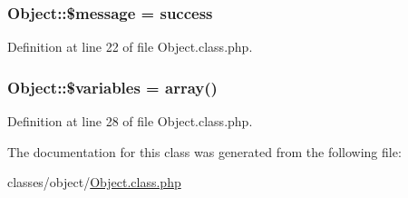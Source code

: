 \hypertarget{classObject_af661550c62873d6b6e61f32d68c56973}{}
\subsubsection[{\$message}]{\setlength{\rightskip}{0pt plus 5cm}Object\+::\$message = \textquotesingle{}success\textquotesingle{}}\label{classObject_af661550c62873d6b6e61f32d68c56973}


Definition at line 22 of file Object.\+class.\+php.

\hypertarget{classObject_a153e76f6619408780cc2b50cef5100c6}{}
\subsubsection[{\$variables}]{\setlength{\rightskip}{0pt plus 5cm}Object\+::\$variables = array()}\label{classObject_a153e76f6619408780cc2b50cef5100c6}


Definition at line 28 of file Object.\+class.\+php.



The documentation for this class was generated from the following file\+:\begin{DoxyCompactItemize}
\item 
classes/object/\hyperlink{Object_8class_8php}{Object.\+class.\+php}\end{DoxyCompactItemize}
